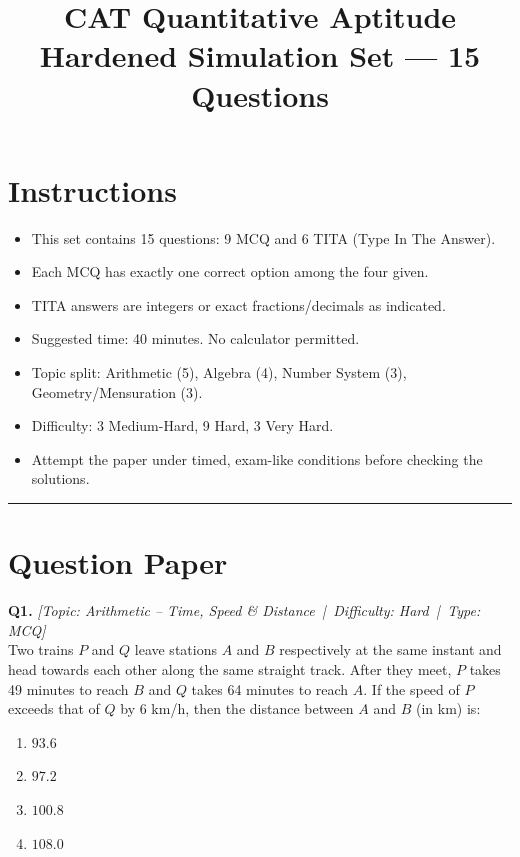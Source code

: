 \documentclass[11pt,a4paper]{article}
\title{\textbf{CAT Quantitative Aptitude}\\[0.2em]\large Hardened Simulation Set --- 15 Questions}
\author{}
\date{}
\newcommand{\qhead}[4]{\vspace{0.4em}\noindent\textbf{Q#1.} \textit{[Topic: #2 \,|\, Difficulty: #3 \,|\, Type: #4]}\\[0.15em]}
\begin{document}
\maketitle
\vspace{-2em}

\section*{Instructions}
\begin{itemize}[leftmargin=1.4em,itemsep=0.15em]
    \item This set contains 15 questions: 9 MCQ and 6 TITA (Type In The Answer).
    \item Each MCQ has exactly one correct option among the four given.
    \item TITA answers are integers or exact fractions/decimals as indicated.
    \item Suggested time: 40 minutes. No calculator permitted.
    \item Topic split: Arithmetic (5), Algebra (4), Number System (3), Geometry/Mensuration (3).
    \item Difficulty: 3 Medium-Hard, 9 Hard, 3 Very Hard.
    \item Attempt the paper under timed, exam-like conditions before checking the solutions.
\end{itemize}

\vspace{0.5em}
\hrule
\vspace{0.5em}

\section*{Question Paper}

\qhead{1}{Arithmetic -- Time, Speed \& Distance}{Hard}{MCQ}
Two trains $P$ and $Q$ leave stations $A$ and $B$ respectively at the same instant and head towards each other along the same straight track. After they meet, $P$ takes 49 minutes to reach $B$ and $Q$ takes 64 minutes to reach $A$. If the speed of $P$ exceeds that of $Q$ by $6$ km/h, then the distance between $A$ and $B$ (in km) is:
\begin{enumerate}[label=(\Alph*),leftmargin=2em]
    \item $93.6$
    \item $97.2$
    \item $100.8$
    \item $108.0$
\end{enumerate}
\end{document}

